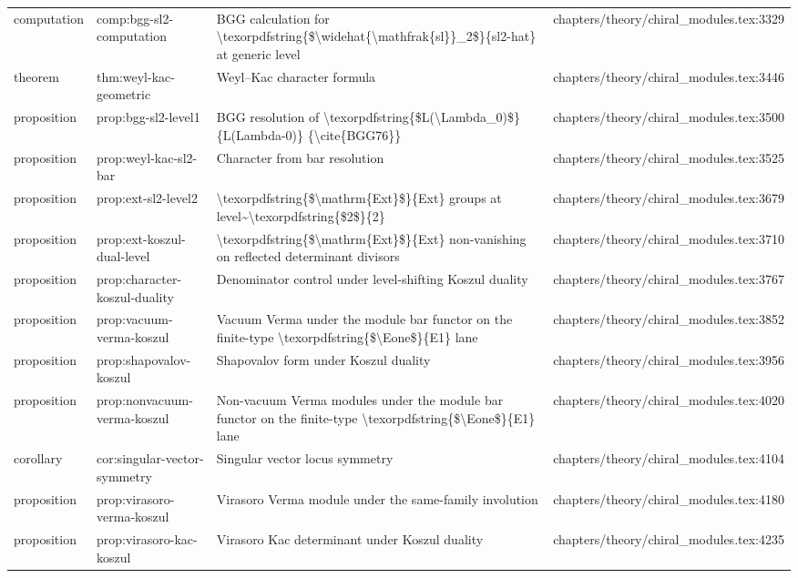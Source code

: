 \documentclass[11pt]{article}
\begin{document}
\begin{longtable}{L{0.10\textwidth}L{0.26\textwidth}L{0.42\textwidth}L{0.22\textwidth}}
computation & comp:bgg-sl2-computation & BGG calculation for \textbackslash{}texorpdfstring\{\$\textbackslash{}widehat\{\textbackslash{}mathfrak\{sl\}\}\_2\$\}\{sl2-hat\} at generic level & chapters/theory/chiral\_modules.tex:3329\\
theorem & thm:weyl-kac-geometric & Weyl--Kac character formula & chapters/theory/chiral\_modules.tex:3446\\
proposition & prop:bgg-sl2-level1 & BGG resolution of \textbackslash{}texorpdfstring\{\$L(\textbackslash{}Lambda\_0)\$\}\{L(Lambda-0)\} \{\textbackslash{}cite\{BGG76\}\} & chapters/theory/chiral\_modules.tex:3500\\
proposition & prop:weyl-kac-sl2-bar & Character from bar resolution & chapters/theory/chiral\_modules.tex:3525\\
proposition & prop:ext-sl2-level2 & \textbackslash{}texorpdfstring\{\$\textbackslash{}mathrm\{Ext\}\$\}\{Ext\} groups at level\textasciitilde{}\textbackslash{}texorpdfstring\{\$2\$\}\{2\} & chapters/theory/chiral\_modules.tex:3679\\
proposition & prop:ext-koszul-dual-level & \textbackslash{}texorpdfstring\{\$\textbackslash{}mathrm\{Ext\}\$\}\{Ext\} non-vanishing on reflected determinant divisors & chapters/theory/chiral\_modules.tex:3710\\
proposition & prop:character-koszul-duality & Denominator control under level-shifting Koszul duality & chapters/theory/chiral\_modules.tex:3767\\
proposition & prop:vacuum-verma-koszul & Vacuum Verma under the module bar functor on the finite-type \textbackslash{}texorpdfstring\{\$\textbackslash{}Eone\$\}\{E1\} lane & chapters/theory/chiral\_modules.tex:3852\\
proposition & prop:shapovalov-koszul & Shapovalov form under Koszul duality & chapters/theory/chiral\_modules.tex:3956\\
proposition & prop:nonvacuum-verma-koszul & Non-vacuum Verma modules under the module bar functor on the finite-type \textbackslash{}texorpdfstring\{\$\textbackslash{}Eone\$\}\{E1\} lane & chapters/theory/chiral\_modules.tex:4020\\
corollary & cor:singular-vector-symmetry & Singular vector locus symmetry & chapters/theory/chiral\_modules.tex:4104\\
proposition & prop:virasoro-verma-koszul & Virasoro Verma module under the same-family involution & chapters/theory/chiral\_modules.tex:4180\\
proposition & prop:virasoro-kac-koszul & Virasoro Kac determinant under Koszul duality & chapters/theory/chiral\_modules.tex:4235\\

\end{longtable}
\end{document}
